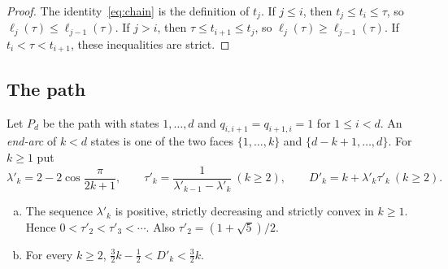 \documentclass[EJP,preprint]{ejpecp}
\begin{document}
\begin{proof}
The identity~\eqref{eq:chain} is the definition of $t_j$. If $j\le i$, then
$t_j\le t_i\le\tau$, so $\ell_j(\tau)\le\ell_{j-1}(\tau)$. If $j>i$, then
$\tau\le t_{i+1}\le t_j$, so $\ell_j(\tau)\ge\ell_{j-1}(\tau)$. If
$t_i<\tau<t_{i+1}$, these inequalities are strict.
\end{proof}

\subsection{The path}\label{app:paths}

Let $P_d$ be the path with states $1,\dots,d$ and $q_{i,i+1}=q_{i+1,i}=1$ for
$1\le i<d$. An \emph{end-arc} of $k<d$ states is one of the two faces
$\{1,\dots,k\}$ and $\{d-k+1,\dots,d\}$. For $k\ge1$ put
\[
 \lambda'_k=2-2\cos\frac{\pi}{2k+1},\qquad
 \tau'_k=\frac1{\lambda'_{k-1}-\lambda'_k}\ (k\ge2),\qquad
 D'_k=k+\lambda'_k\tau'_k\ (k\ge2).
\]

\begin{lemma}\label{lem:Dprime}
\begin{enumerate}[(a)]
\item The sequence $\lambda'_k$ is positive, strictly decreasing and strictly
convex in $k\ge1$. Hence $0<\tau'_2<\tau'_3<\cdots$. Also
$\tau'_2=(1+\sqrt5)/2$.
\item For every $k\ge2$, $\frac32k-\frac12<D'_k<\frac32k$.
\end{enumerate}
\end{lemma}
\end{document}
